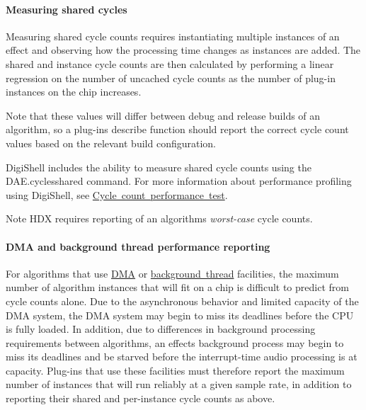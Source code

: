 \hypertarget{a00832_subsubsection__measuring_shared_cycles_}{}\paragraph{Measuring shared cycles}\label{a00832_subsubsection__measuring_shared_cycles_}
 Measuring shared cycle counts requires instantiating multiple instances of an effect and observing how the processing time changes as instances are added. The shared and instance cycle counts are then calculated by performing a linear regression on the number of uncached cycle counts as the number of plug-\/in instances on the chip increases.

Note that these values will differ between debug and release builds of an algorithm, so a plug-\/in\textquotesingle{}s describe function should report the correct cycle count values based on the relevant build configuration.

Digi\+Shell includes the ability to measure shared cycle counts using the {\ttfamily D\+A\+E.\+cyclesshared} command. For more information about performance profiling using Digi\+Shell, see \mbox{\hyperlink{a00835_subsection__cyclessharedtest}{Cycle count performance test}}.

\begin{DoxyNote}{Note}
H\+DX requires reporting of an algorithm\textquotesingle{}s {\itshape worst-\/case} cycle counts.
\end{DoxyNote}
\hypertarget{a00832_subsubsection__dma_and_background_thread_performance_reporting_}{}\paragraph{D\+M\+A and background thread performance reporting}\label{a00832_subsubsection__dma_and_background_thread_performance_reporting_}
 For algorithms that use \mbox{\hyperlink{a00810}{D\+MA}} or \mbox{\hyperlink{a00811}{background thread}} facilities, the maximum number of algorithm instances that will fit on a chip is difficult to predict from cycle counts alone. Due to the asynchronous behavior and limited capacity of the D\+MA system, the D\+MA system may begin to miss its deadlines before the C\+PU is fully loaded. In addition, due to differences in background processing requirements between algorithms, an effect\textquotesingle{}s background process may begin to miss its deadlines and be starved before the interrupt-\/time audio processing is at capacity. Plug-\/ins that use these facilities must therefore report the maximum number of instances that will run reliably at a given sample rate, in addition to reporting their shared and per-\/instance cycle counts as above.

